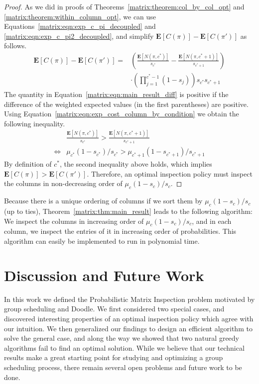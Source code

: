 \begin{proof}
 	As we did in proofs of Theorems~\ref{matrix:theorem:col_by_col_opt} and \ref{matrix:theorem:within_column_opt}, we can use Equations~\ref{matrix:eqn:exp_c_pi_decoupled} and \ref{matrix:eqn:exp_c_pi2_decoupled}, and simplify $\mathbf{E}[C(\pi)] - \mathbf{E}[C(\pi')]$ as follows.
	\small
 	\begin{equation} \label{matrix:eqn:main_result_diff}
 		\begin{aligned}
 		\mathbf{E}[C(\pi)] - \mathbf{E}[C(\pi')] ={} & \left(\frac{\mathbf{E}[N(\pi, c^*)]}{s_{c^*}}  - \frac{\mathbf{E}[N(\pi, c^*+1)]}{s_{c^*+1}} \right) \\
 		& \cdot \left( \prod_{j=1}^{c^*-1} (1 - s_j)\right) s_{c^*} s_{c^*+1}
 		 \end{aligned}
 	\end{equation}	
	\normalsize
 	The quantity in Equation~\ref{matrix:eqn:main_result_diff} is positive if the difference of the weighted expected values (in the first parentheses) are positive. Using Equation~\ref{matrix:eqn:exp_cost_column_by_condition} we obtain the following inequality.
 	\begin{equation*}
 		\begin{aligned}
 			{} &
 		\frac{\mathbf{E}[N(\pi, c^*)]}{s_{c^*}}  > \frac{\mathbf{E}[N(\pi, c^*+1)]}{s_{c^*+1}} \\
 		\Leftrightarrow &
 		\mu_{c^*} (1 - s_{c^*}) / s_{c^*} > \mu_{c^*+1}(1 - s_{c^*+1}) / s_{c^*+1} 
 		\end{aligned}
 	\end{equation*}
 	By definition of $c^*$, the second inequality above holds, which implies $\mathbf{E}[C(\pi)] > \mathbf{E}[C(\pi')]$.
 	Therefore, an optimal inspection policy must inspect the columns in non-decreasing order of $\mu_c(1 - s_c)/s_c$. 
 \end{proof}
 Because there is a unique ordering of columns if we sort them by $\mu_c(1-s_c)/s_c$ (up to ties), Theorem~\ref{matrix:thm:main_result} leads to the following algorithm: We inspect the columns in increasing order of $\mu_c(1-s_c)/s_c$, and in each column, we inspect the entries of it in increasing order of probabilities. 
 This algorithm can easily be implemented to run in polynomial time. 


\section{Discussion and Future Work} \label{matrix:sec:discussion}
In this work we defined the Probabilistic Matrix Inspection problem motivated by group scheduling and Doodle. 
We first considered two special cases, and discovered interesting properties of an optimal inspection policy which agree with our intuition. We then generalized our findings to design an efficient algorithm to solve the general case, and along the way we showed that two natural greedy algorithms fail to find an optimal solution. While we believe that our technical results make a great starting point for studying and optimizing a group scheduling process, there remain several open problems and future work to be done.

